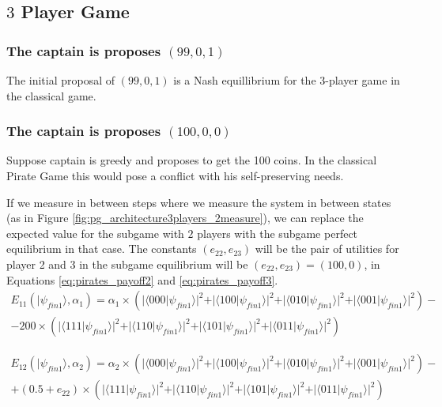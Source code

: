 \subsection{$3$ Player Game}
\label{subsec:3playergame}

\subsubsection{The captain is proposes $(99, 0, 1)$}
\label{subsubsec:3playergame99}

The initial proposal of $(99, 0, 1)$ is a Nash equillibrium for the $3$-player game in the classical game.


\subsubsection{The captain is proposes $(100, 0, 0)$}
\label{subsubsec:3playergame100}

Suppose captain is greedy and proposes to get the 100 coins. In the classical Pirate Game this would pose a conflict with his self-preserving needs.



If we measure in between steps where we measure the system in between states (as in Figure \ref{fig:pg_architecture3players_2measure}), we can replace the expected value for the subgame with $2$ players with the subgame perfect equilibrium in that case. The constants $(e_{22}, e_{23})$ will be the pair of utilities for player 2 and 3 in the subgame equilibrium will be $(e_{22}, e_{23})=(100, 0)$, in Equations \ref{eq:pirates_payoff2} and \ref{eq:pirates_payoff3}.  
 \begin{equation}
\begin{split}
E_{11}(\vert\psi_{fin1}\rangle, \alpha_{1})=\alpha_{1}\times(\vert\langle000\vert\psi_{fin1}\rangle\vert^{2} + \vert\langle100\vert\psi_{fin1}\rangle\vert^{2}
+ \vert\langle010\vert\psi_{fin1}\rangle\vert^{2}
+ \vert\langle001\vert\psi_{fin1}\rangle\vert^{2}
 ) - \\
 - 200\times(\vert\langle111\vert\psi_{fin1}\rangle\vert^{2} + \vert\langle110\vert\psi_{fin1}\rangle\vert^{2}
+ \vert\langle101\vert\psi_{fin1}\rangle\vert^{2}
+ \vert\langle011\vert\psi_{fin1}\rangle\vert^{2}
 )
\end{split}
\end{equation}

 \begin{equation}
\begin{split}
E_{12}(\vert\psi_{fin1}\rangle, \alpha_{2})=\alpha_{2}\times(\vert\langle000\vert\psi_{fin1}\rangle\vert^{2} + \vert\langle100\vert\psi_{fin1}\rangle\vert^{2}
+ \vert\langle010\vert\psi_{fin1}\rangle\vert^{2}
+ \vert\langle001\vert\psi_{fin1}\rangle\vert^{2}
 ) - \\
 + (0.5 + e_{22})\times(\vert\langle111\vert\psi_{fin1}\rangle\vert^{2} + \vert\langle110\vert\psi_{fin1}\rangle\vert^{2}
+ \vert\langle101\vert\psi_{fin1}\rangle\vert^{2}
+ \vert\langle011\vert\psi_{fin1}\rangle\vert^{2}
 )
\end{split}
\label{eq:pirates_payoff2}
\end{equation}


